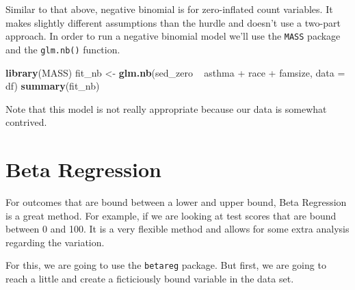 \documentclass[]{tufte-book}
\newenvironment{Shaded}{}{}
\newcommand{\KeywordTok}[1]{\textcolor[rgb]{0.00,0.44,0.13}{\textbf{#1}}}
\newcommand{\DataTypeTok}[1]{\textcolor[rgb]{0.56,0.13,0.00}{#1}}
\newcommand{\FloatTok}[1]{\textcolor[rgb]{0.25,0.63,0.44}{#1}}
\newcommand{\StringTok}[1]{\textcolor[rgb]{0.25,0.44,0.63}{#1}}
\newcommand{\OtherTok}[1]{\textcolor[rgb]{0.00,0.44,0.13}{#1}}
\newcommand{\OperatorTok}[1]{\textcolor[rgb]{0.40,0.40,0.40}{#1}}
\newcommand{\NormalTok}[1]{#1}
\theoremstyle{definition}
\theoremstyle{definition}
\theoremstyle{remark}
\begin{document}
Similar to that above, negative binomial is for zero-inflated count
variables. It makes slightly different assumptions than the hurdle and
doesn't use a two-part approach. In order to run a negative binomial
model we'll use the \texttt{MASS} package and the \texttt{glm.nb()}
function.

\begin{Shaded}
\begin{Highlighting}[]
\KeywordTok{library}\NormalTok{(MASS)}
\NormalTok{fit_nb <-}\StringTok{ }\KeywordTok{glm.nb}\NormalTok{(sed_zero }\OperatorTok{~}\StringTok{ }\NormalTok{asthma }\OperatorTok{+}\StringTok{ }\NormalTok{race }\OperatorTok{+}\StringTok{ }\NormalTok{famsize, }
    \DataTypeTok{data =}\NormalTok{ df)}
\KeywordTok{summary}\NormalTok{(fit_nb)}
\end{Highlighting}
\end{Shaded}

Note that this model is not really appropriate because our data is
somewhat contrived.

\section*{Beta Regression}\label{beta-regression}

For outcomes that are bound between a lower and upper bound, Beta
Regression is a great method. For example, if we are looking at test
scores that are bound between 0 and 100. It is a very flexible method
and allows for some extra analysis regarding the variation.

For this, we are going to use the \texttt{betareg} package. But first,
we are going to reach a little and create a ficticiously bound variable
in the data set.

\begin{Shaded}
\end{Shaded}
\end{document}
